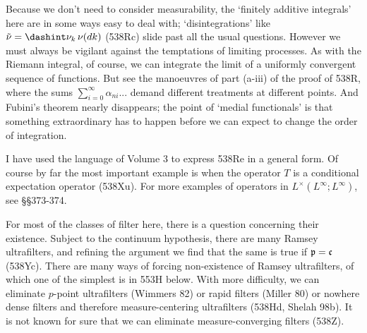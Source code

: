 {Because we don't need to consider measurability, the `finitely additive
integrals' here are in some ways easy to deal with;  `disintegrations' like
$\tilde\nu=\dashint\nu_k\,\nu(dk)$
(538Rc) slide past all the usual questions.
However we must always be vigilant against the temptations of limiting
processes.   As with the Riemann integral, of course, we can integrate
the limit of a uniformly convergent sequence of functions.   But see the
manoeuvres of part (a-iii) of the proof of 538R, where
the sums $\sum_{i=0}^{\infty}\alpha_{ni}...$ demand different treatments at
different points.   And Fubini's theorem nearly disappears;  the point of
`medial functionals' is that something extraordinary has to happen before
we can expect to change the order of integration.

I have used the language of Volume 3 to express 538Re in a general form.
Of course by far the most important example is when the operator $T$ is a
conditional expectation operator (538Xu).   For more examples of operators
in $L^{\times}(L^{\infty};L^{\infty})$, see \S\S373-374.

For most of the classes of filter here, there is a question concerning
their existence.   Subject to the continuum hypothesis, there are many
Ramsey ultrafilters, and refining the argument we find that the same is
true if $\frak p=\frak c$ (538Yc).
There are many ways of forcing non-existence
of Ramsey ultrafilters, of which one of
the simplest is in 553H below.   With more difficulty, we can eliminate
$p$-point ultrafilters ({\smc Wimmers 82})
or rapid filters ({\smc Miller 80}) or nowhere dense
filters and therefore measure-centering ultrafilters
(538Hd, {\smc Shelah 98b}).   It is not known for sure that we can
eliminate measure-converging filters (538Z).

}%

\discrpage

